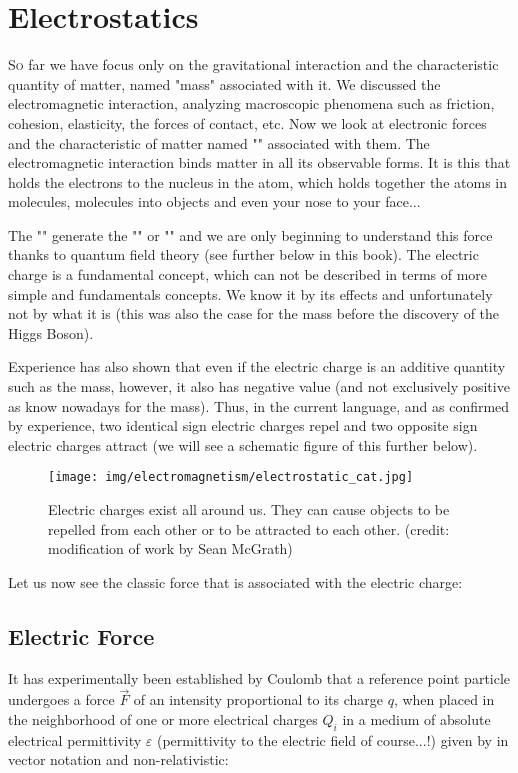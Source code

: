 	\newpage
	\thispagestyle{empty}
	\mbox{}	
	\section{Electrostatics}
	\lettrine[lines=4]{\color{BrickRed}S}o far we have focus only on the gravitational interaction and the characteristic quantity of matter, named "mass" associated with it. We discussed the electromagnetic interaction, analyzing macroscopic phenomena such as friction, cohesion, elasticity, the forces of contact, etc. Now we look at electronic forces and the characteristic of matter named "" associated with them. The electromagnetic interaction binds matter in all its observable forms. It is this that holds the electrons to the nucleus in the atom, which holds together the atoms in molecules, molecules into objects and even your nose to your face...
	
	The "" generate the "" or "" and we are only beginning to understand this force thanks to quantum field theory (see further below in this book). The electric charge is a fundamental concept, which can not be described in terms of more simple and fundamentals concepts. We know it by its effects and unfortunately not by what it is (this was also the case for the mass before the discovery of the Higgs Boson).
	
	Experience has also shown that even if the electric charge is an additive quantity such as the mass, however, it also has negative value (and not exclusively positive as know nowadays for the mass). Thus, in the current language, and as confirmed by experience, two identical sign electric charges repel and two opposite sign electric charges attract (we will see a schematic figure of this further below).
	\begin{figure}[H]
		\centering
		\texttt{[image: img/electromagnetism/electrostatic\_cat.jpg]}
		\caption[]{Electric charges exist all around us. They can cause objects to be repelled from each other or to be attracted to each
other. (credit: modification of work by Sean McGrath)}
	\end{figure}
	Let us now see the classic force that is associated with the electric charge:
	
	\subsection{Electric Force}
	It has experimentally been established by Coulomb that a reference point particle undergoes a force $\vec{F}$ of an intensity proportional to its charge $q$, when placed in the neighborhood of one or more electrical charges $Q_i$ in a medium of absolute electrical permittivity $\varepsilon$ (permittivity to the electric field of course...!) given by in vector notation and non-relativistic:
	
